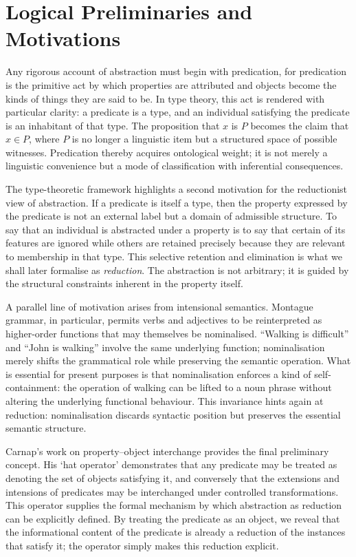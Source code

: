 \documentclass[12pt,letterpaper]{article}
\begin{document}
\section{Logical Preliminaries and Motivations}

Any rigorous account of abstraction must begin with predication, for predication is the primitive act by which properties are attributed and objects become the kinds of things they are said to be. In type theory, this act is rendered with particular clarity: a predicate is a type, and an individual satisfying the predicate is an inhabitant of that type. The proposition that $x$ is $P$ becomes the claim that $x \in P$, where $P$ is no longer a linguistic item but a structured space of possible witnesses. Predication thereby acquires ontological weight; it is not merely a linguistic convenience but a mode of classification with inferential consequences.

The type-theoretic framework highlights a second motivation for the reductionist view of abstraction. If a predicate is itself a type, then the property expressed by the predicate is not an external label but a domain of admissible structure. To say that an individual is abstracted under a property is to say that certain of its features are ignored while others are retained precisely because they are relevant to membership in that type. This selective retention and elimination is what we shall later formalise as \emph{reduction}. The abstraction is not arbitrary; it is guided by the structural constraints inherent in the property itself.

A parallel line of motivation arises from intensional semantics. Montague grammar, in particular, permits verbs and adjectives to be reinterpreted as higher-order functions that may themselves be nominalised. “Walking is difficult” and “John is walking” involve the same underlying function; nominalisation merely shifts the grammatical role while preserving the semantic operation. What is essential for present purposes is that nominalisation enforces a kind of self-containment: the operation of walking can be lifted to a noun phrase without altering the underlying functional behaviour. This invariance hints again at reduction: nominalisation discards syntactic position but preserves the essential semantic structure.

Carnap’s work on property–object interchange provides the final preliminary concept. His `hat operator’ demonstrates that any predicate may be treated as denoting the set of objects satisfying it, and conversely that the extensions and intensions of predicates may be interchanged under controlled transformations. This operator supplies the formal mechanism by which abstraction as reduction can be explicitly defined. By treating the predicate as an object, we reveal that the informational content of the predicate is already a reduction of the instances that satisfy it; the operator simply makes this reduction explicit.
\end{document}
